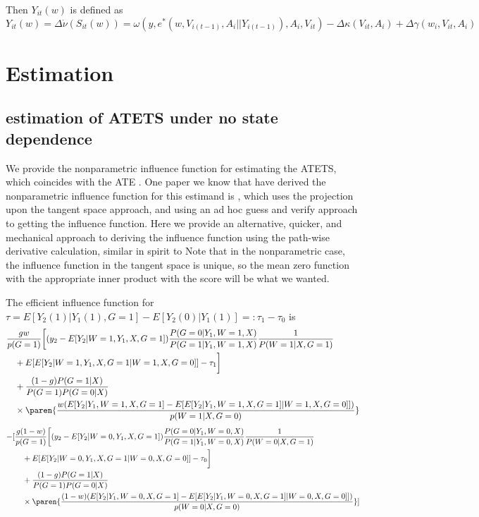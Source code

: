 \documentclass[uplatex,dvipdfmx]{jsarticle}
\begin{document}
Then $Y_{it}(w)$ is defined as 
\begin{equation}
    Y_{it}(w) = \Delta \dot{\nu}( S_{it}(w)) = \omega ( y, e^*( w, V_{i(t-1)}, A_i || Y_{i(t-1)}), A_i, V_{it} ) - \Delta \kappa ( V_{it}, A_i) + \Delta \gamma(w_i,V_{it}, A_i)
\end{equation}

\section{Estimation}

\subsection{estimation of ATETS under no state dependence}

We provide the nonparametric influence function for estimating the ATETS, which coincides with the ATE . One paper we know that have derived the nonparametric influence function for this estimand is \cite{chen2021semiparametric}, which uses the projection upon the tangent space approach, and using an ad hoc guess and verify approach to getting the influence function. Here we provide an alternative, quicker, and mechanical approach to deriving the influence function using the path-wise derivative calculation, similar in spirit to \cite{ichimura2022influence}
Note that in the nonparametric case, the influence function in the tangent space is unique, so the mean zero function with the appropriate inner product with the score will be what we wanted.
\todo 
\begin{theorem} 
\label{the:atesteif}
    The efficient influence function for $\tau = E[ Y_2(1) | Y_1(1) , G=1] - E[ Y_2(0) | Y_1(1)   ]=: \tau_1 - \tau_0 $ is 
    \begin{align}
        &\frac{ g w }{ p(G=1) } \biggl[ (y_2 - E[ Y_2 | W=1 , Y_1 , X, G =1]  ) \frac{ P( G =0| Y_1 , W=1 , X ) }{ P(G=1 | Y_1 , W=1 , X ) } \frac{1}{P( W=1 | X , G=1)}\\
        &\quad+ E [ E[ Y_2 | W = 1, Y_1 , X, G =1 | W =1, X, G= 0 ] ] - \tau_1\biggr] \\
        &\quad+\frac{ (1- g) P(G = 1|X)   }{ P(G= 1) P ( G =0 |X) } \\
        &\quad\times\paren{ \frac{ w ( E [ Y _ 2 | Y_1,W =1 , X, G =1 ] - E [ E[ Y_2 | Y_1, W=1, X, G=1 ] | W =1, X, G= 0 ] ] ) }{ p ( W =1 | X, G =0 ) } }
        \end{align}
        \begin{align}
        -[&\frac{ g (1-w) }{ p(G=1) } \biggl[ (y_2 - E[ Y_2 | W=0 , Y_1 , X, G =1]  ) \frac{ P( G =0| Y_1 , W=0 , X ) }{ P(G=1 | Y_1 , W=0 , X ) } \frac{1}{P( W=0 | X , G=1)}\\
        &\quad+ E [ E[ Y_2 | W = 0, Y_1 , X, G =1 | W =0, X, G= 0 ] ] - \tau_0\biggr] \\
        &\quad+\frac{ (1- g) P(G = 1|X)   }{ P(G= 1) P ( G =0 |X) } \\
        &\quad\times\paren{ \frac{ (1-w) ( E [ Y _ 2 | Y_1,W =0 , X, G =1 ] - E [ E[ Y_2 | Y_1, W=0, X, G=1 ] | W =0, X, G= 0 ] ] ) }{ p ( W =0 | X, G =0 ) } }]
    \end{align}
\end{theorem}
\end{document}
